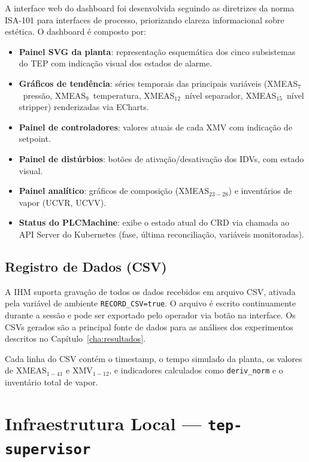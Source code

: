 A interface web do dashboard foi desenvolvida seguindo as diretrizes da norma ISA-101 para interfaces de processo, priorizando clareza informacional sobre estética. O dashboard é composto por:

\begin{itemize}
  \item \textbf{Painel SVG da planta}: representação esquemática dos cinco subsistemas do TEP com indicação visual dos estados de alarme.
  \item \textbf{Gráficos de tendência}: séries temporais das principais variáveis (XMEAS$_7$~pressão, XMEAS$_9$~temperatura, XMEAS$_{12}$~nível separador, XMEAS$_{15}$~nível stripper) renderizadas via ECharts.
  \item \textbf{Painel de controladores}: valores atuais de cada XMV com indicação de setpoint.
  \item \textbf{Painel de distúrbios}: botões de ativação/desativação dos IDVs, com estado visual.
  \item \textbf{Painel analítico}: gráficos de composição (XMEAS$_{23-28}$) e inventários de vapor (UCVR, UCVV).
  \item \textbf{Status do PLCMachine}: exibe o estado atual do CRD via chamada ao API Server do Kubernetes (fase, última reconciliação, variáveis monitoradas).
\end{itemize}


\subsection{Registro de Dados (CSV)}

A IHM suporta gravação de todos os dados recebidos em arquivo CSV, ativada pela variável de ambiente \texttt{RECORD\_CSV=true}. O arquivo é escrito continuamente durante a sessão e pode ser exportado pelo operador via botão na interface. Os CSVs gerados são a principal fonte de dados para as análises dos experimentos descritos no Capítulo~\ref{cha:resultados}.

Cada linha do CSV contém o timestamp, o tempo simulado da planta, os valores de XMEAS$_{1-41}$ e XMV$_{1-12}$, e indicadores calculados como \texttt{deriv\_norm} e o inventário total de vapor.

\section{Infraestrutura Local — \texttt{tep-supervisor}}
\label{sec:supervisor}

